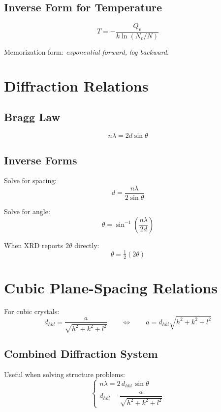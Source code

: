 \documentclass[11pt, letterpaper]{article}
\newcommand{\Qv}{Q_v}
\newcommand{\dhkl}{d_{hkl}}
\begin{document}
\subsection{Inverse Form for Temperature}

\[
T = -\frac{\Qv}{k\ln\!\left(N_v/N\right)}
\]

\noindent
Memorization form: \emph{exponential forward, log backward}.

\section{Diffraction Relations}

\subsection{Bragg Law}

\[
n\lambda = 2d\sin\theta
\]

\subsection{Inverse Forms}

Solve for spacing:
\[
d = \frac{n\lambda}{2\sin\theta}
\]

Solve for angle:
\[
\theta = \sin^{-1}\!\left(\frac{n\lambda}{2d}\right)
\]

\noindent
When XRD reports $2\theta$ directly:
\[
\theta = \tfrac{1}{2}(2\theta)
\]

\section{Cubic Plane-Spacing Relations}

For cubic crystals:
\[
\dhkl = \frac{a}{\sqrt{h^2 + k^2 + l^2}}
\qquad\Longleftrightarrow\qquad
a = \dhkl\sqrt{h^2 + k^2 + l^2}
\]

\subsection{Combined Diffraction System}

Useful when solving structure problems:
\[
\begin{cases}
  n\lambda = 2\,\dhkl\,\sin\theta \\[4pt]
  \dhkl = \dfrac{a}{\sqrt{h^2+k^2+l^2}}
\end{cases}
\]
\end{document}
